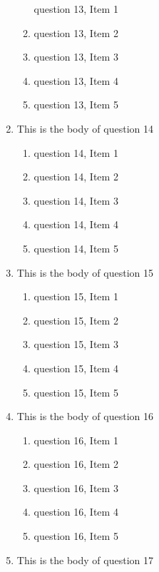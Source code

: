 \documentclass{article}
\begin{document}
\begin{enumerate}
\begin{enumerate}
    question 13, Item 1
    \item
    question 13, Item 2
    \item
    question 13, Item 3
    \item
    question 13, Item 4
    \item
    question 13, Item 5
    \end{enumerate}
\item
This is the body of question 14
    \begin{enumerate}
    \item
    question 14, Item 1
    \item
    question 14, Item 2
    \item
    question 14, Item 3
    \item
    question 14, Item 4
    \item
    question 14, Item 5
    \end{enumerate}
\item
This is the body of question 15
    \begin{enumerate}
    \item
    question 15, Item 1
    \item
    question 15, Item 2
    \item
    question 15, Item 3
    \item
    question 15, Item 4
    \item
    question 15, Item 5
    \end{enumerate}
\item
This is the body of question 16
    \begin{enumerate}
    \item
    question 16, Item 1
    \item
    question 16, Item 2
    \item
    question 16, Item 3
    \item
    question 16, Item 4
    \item
    question 16, Item 5
    \end{enumerate}
\item
This is the body of question 17

\end{enumerate}
\end{document}
